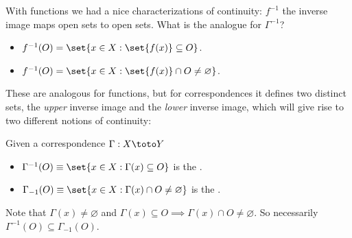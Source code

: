 \documentclass{article}
\begin{document}
With functions we had a nice characterizations of continuity: $f^{-1}$ the inverse image maps open sets to open sets. What is the analogue for $\Gamma^{-1}$?
\begin{itemize}[label=$\bullet$]
  \item $f^{-1}(O) = \set{x \in X: \set{f(x)} \subseteq O}$.

  \item $f^{-1}(O) = \set{x \in X: \set{f(x)} \cap O \ne \varnothing}$.
\end{itemize}

These are analogous for functions, but for correspondences it defines two distinct sets, the \textit{upper} inverse image and the \textit{lower} inverse image, which will give rise to two different notions of continuity:
\begin{definition}
  Given a correspondence $\Gamma: X \toto Y$
  \begin{itemize}[label=$\bullet$]
    \item $\Gamma^{-1}(O) \equiv \set{x \in X: \Gamma(x) \subseteq O}$ is the .

    \item $\Gamma_{-1}(O) \equiv \set{x \in X: \Gamma(x) \cap O \ne \varnothing}$ is the .
  \end{itemize}
\end{definition}

Note that $\Gamma(x) \ne \varnothing$ and $\Gamma(x) \subseteq O \implies \Gamma(x) \cap O \ne \varnothing$. So necessarily $\Gamma^{-1}(O) \subseteq \Gamma_{-1}(O)$.
\end{document}

